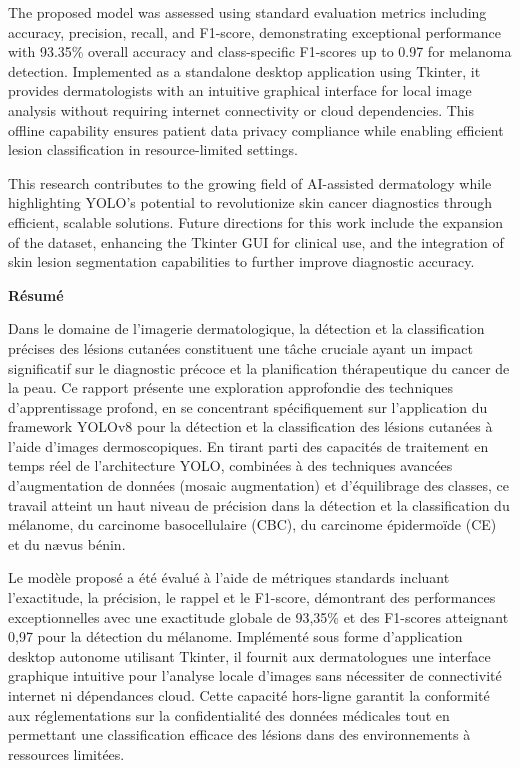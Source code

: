 \documentclass[a4paper,12pt]{report}
\begin{document}
\begin{spacing}{1.5}
    The proposed model was assessed using standard evaluation metrics including accuracy, precision, recall, and F1-score, demonstrating exceptional performance with 93.35\% overall accuracy and class-specific F1-scores up to 0.97 for melanoma detection. Implemented as a standalone desktop application using Tkinter, it provides dermatologists with an intuitive graphical interface for local image analysis without requiring internet connectivity or cloud dependencies. This offline capability ensures patient data privacy compliance while enabling efficient lesion classification in resource-limited settings.

    This research contributes to the growing field of AI-assisted dermatology while highlighting YOLO's potential to revolutionize skin cancer diagnostics through efficient, scalable solutions. Future directions for this work include the expansion of the dataset, enhancing the Tkinter GUI for clinical use, and the integration of skin lesion segmentation capabilities to further improve diagnostic accuracy.


    \newpage
\begin{center}
    \textbf{\huge Résumé}
\end{center}

    Dans le domaine de l'imagerie dermatologique, la détection et la classification précises des lésions cutanées constituent une tâche cruciale ayant un impact significatif sur le diagnostic précoce et la planification thérapeutique du cancer de la peau. Ce rapport présente une exploration approfondie des techniques d'apprentissage profond, en se concentrant spécifiquement sur l'application du framework YOLOv8 pour la détection et la classification des lésions cutanées à l'aide d'images dermoscopiques. En tirant parti des capacités de traitement en temps réel de l'architecture YOLO, combinées à des techniques avancées d'augmentation de données (mosaic augmentation) et d'équilibrage des classes, ce travail atteint un haut niveau de précision dans la détection et la classification du mélanome, du carcinome basocellulaire (CBC), du carcinome épidermoïde (CE) et du nævus bénin.

    Le modèle proposé a été évalué à l'aide de métriques standards incluant l'exactitude, la précision, le rappel et le F1-score, démontrant des performances exceptionnelles avec une exactitude globale de 93,35\% et des F1-scores atteignant 0,97 pour la détection du mélanome. Implémenté sous forme d'application desktop autonome utilisant Tkinter, il fournit aux dermatologues une interface graphique intuitive pour l'analyse locale d'images sans nécessiter de connectivité internet ni dépendances cloud. Cette capacité hors-ligne garantit la conformité aux réglementations sur la confidentialité des données médicales tout en permettant une classification efficace des lésions dans des environnements à ressources limitées.


\end{spacing}
\end{document}
